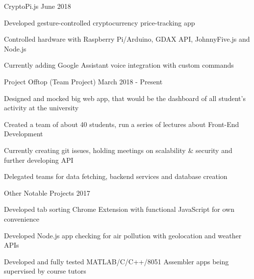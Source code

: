 \begin{cventries}
\cventryproject
{CryptoPi.js} %
{June 2018} %
  {
    \begin{cvitems} %
      \item Developed gesture-controlled cryptocurrency price-tracking app
      \item Controlled hardware with  Raspberry Pi/Arduino, GDAX API, JohnnyFive.js and Node.js
      \item Currently adding Google Assistant voice integration with custom commands
  \end{cvitems}
  }

\cventryproject
{Project Offtop (Team Project)} %
{March 2018 - Present} %
  {
    \begin{cvitems} %
      \item Designed and mocked big web app, that would be the dashboard of all student's activity at the university
      \item Created a team of about 40 students, run a series of lectures about Front-End Development
      \item Currently creating git issues, holding meetings on scalability \& security and further developing API
      \item Delegated teams for data fetching, backend services and database creation
      \end{cvitems}
  }

\cventryproject
{Other Notable Projects} %
{2017} %
  {
    \begin{cvitems} %
      \item Developed tab sorting Chrome Extension with functional JavaScript for own convenience
      \item Developed Node.js app checking for air pollution with geolocation and weather APIs
      \item Developed and fully tested MATLAB/C/C++/8051 Assembler apps being supervised by course tutors
  \end{cvitems}
  }

\end{cventries}
